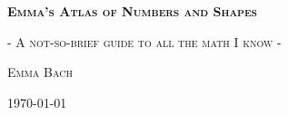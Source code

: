 \begin{titlepage}
	\centering
	{\Huge \scshape \bfseries Emma's Atlas of Numbers and Shapes\par}
    \vspace{0.5cm}
    {\Large \scshape- A not-so-brief guide to all the math I know -\par}
    \vfill
	{\Large \scshape Emma Bach\par}
	\vfill
	{\scshape \today\par}
\end{titlepage}
